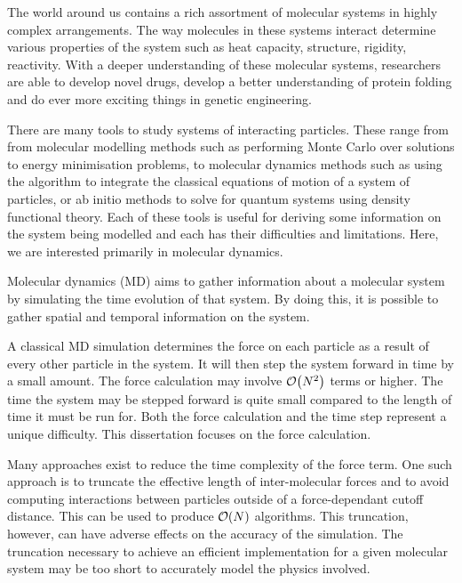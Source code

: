 %
%

%
The world around us contains
a rich assortment of molecular systems in
highly complex arrangements.
%
The way molecules in these systems interact determine various properties
of the system such as heat capacity, structure, rigidity, reactivity.
%
With a deeper understanding of these molecular systems,
researchers are able to develop novel drugs,
develop a better understanding of protein folding and
do ever more exciting things in genetic engineering.

%
There are many tools to study systems of interacting particles.
These range from from molecular modelling methods such as performing
Monte Carlo over solutions to energy minimisation problems,
to molecular dynamics methods such as using the \velocityverlet{}
algorithm to integrate the classical equations of motion of a
system of particles, or ab initio methods to solve for quantum systems
using density functional theory.
%
Each of these tools is useful for
deriving some information on the system being modelled and
each has their difficulties and limitations.
%
Here, we are interested primarily in molecular dynamics.


%
Molecular dynamics (MD) aims to
gather information about a molecular system by
simulating the time evolution of that system.
%
By doing this, it is possible to
gather spatial and temporal information on the system.


%
A classical MD simulation determines
the force on each particle as a result of
every other particle in the system.
%
It will then step the system forward in time by a small amount.
%
The force calculation may involve $\mathcal{O}{\left({ N^2 }\right)}$ terms or higher.
%
The time the system may be stepped forward is
quite small compared to the length of time it must be run for.
%
Both the force calculation and the time step represent a unique difficulty.
%
This dissertation focuses on the force calculation.


Many approaches exist to reduce the time complexity of
the force term.
%
One such approach is to truncate the effective length of inter-molecular
forces and to avoid computing interactions between particles outside of a
force-dependant cutoff distance.
This can be used to produce $\mathcal{O}{\left({ N }\right)}$ algorithms.
%
This truncation, however, can have adverse effects on the accuracy
of the simulation.
%
The truncation necessary to achieve an efficient implementation
for a given molecular system may be
too short to accurately model the physics involved.

